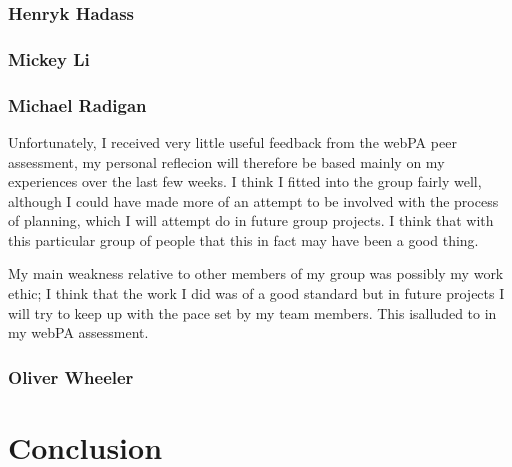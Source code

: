 \documentclass[11pt]{article}
\begin{document}
\subsubsection*{Henryk Hadass}

\subsubsection*{Mickey Li}


\subsubsection*{Michael Radigan}
Unfortunately, I received very little useful feedback from the webPA peer
assessment, my personal reflecion will therefore be based mainly on my
experiences over the last few weeks. I think I fitted into the group fairly 
well, although I could have made more of an attempt to be involved with
the process of planning, which I will attempt do in future group projects.
I think that with this particular group of people that this in fact may have
been a good thing.

My main weakness relative to other members of my group was possibly my work
ethic; I think that the work I did was of a good standard but in future
projects I will try to keep up with the pace set by my team members. This isalluded to in my webPA assessment.



\subsubsection*{Oliver Wheeler}

\section{Conclusion}
\end{document}
